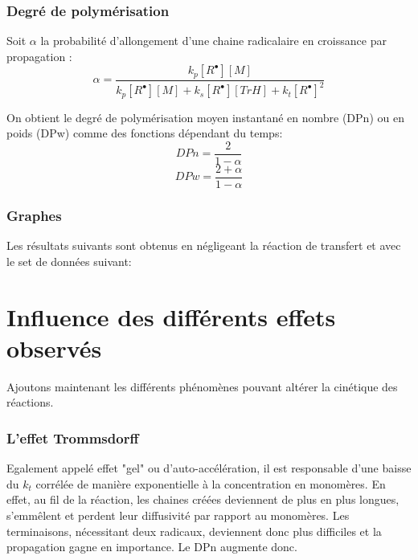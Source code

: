 \documentclass[a4paper,oneside,12pt]{article}
\begin{document}



\section{Degré de polymérisation}
Soit $\alpha$ la probabilité d'allongement d'une chaine radicalaire en croissance par propagation : 
$$\alpha=\frac{k_p[R^{\bullet}][M]}{k_p[R^{\bullet}][M]+k_s[R^{\bullet}][TrH]+k_t[R^{\bullet}]^2}$$

On obtient le degré de polymérisation moyen instantané en nombre (DPn) ou en poids (DPw) comme des fonctions dépendant du temps:
$$DPn=\frac{2}{1-\alpha}$$
$$DPw=\frac{2+\alpha}{1-\alpha}$$

\section{Graphes}
Les résultats suivants sont obtenus en négligeant la réaction de transfert et avec le set de données suivant:


\part{Influence des différents effets observés}

Ajoutons maintenant les différents phénomènes pouvant altérer la cinétique des réactions.\\

\section{L'effet Trommsdorff} 
Egalement appelé effet "gel" ou d'auto-accélération, il est responsable d'une baisse du $k_t$ corrélée de manière exponentielle à la concentration en monomères. En effet, au fil de la réaction, les chaines créées deviennent de plus en plus longues, s'emmêlent et perdent leur diffusivité par rapport au monomères. Les terminaisons, nécessitant deux radicaux, deviennent donc plus difficiles et la propagation gagne en importance. Le DPn augmente donc.\\
\end{document}
